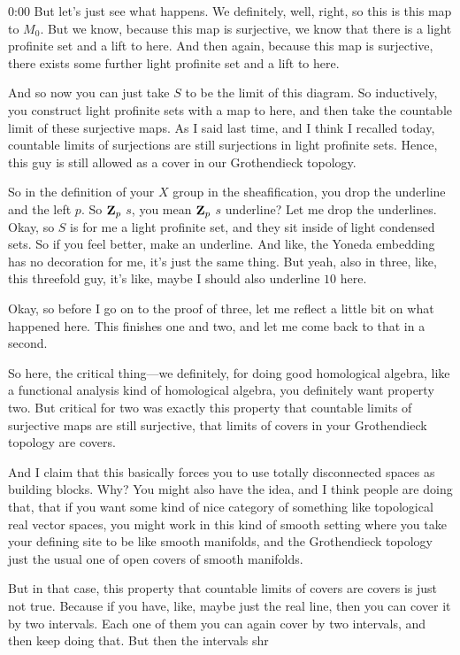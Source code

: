 \begin{unfinished}{0:00}
But let's just see what happens. We definitely, well, right, so this is this map to $M_0$. But we know, because this map is surjective, we know that there is a light profinite set and a lift to here. And then again, because this map is surjective, there exists some further light profinite set and a lift to here.

And so now you can just take $S$ to be the limit of this diagram. So inductively, you construct light profinite sets with a map to here, and then take the countable limit of these surjective maps. As I said last time, and I think I recalled today, countable limits of surjections are still surjections in light profinite sets. Hence, this guy is still allowed as a cover in our Grothendieck topology.

So in the definition of your $X$ group in the sheafification, you drop the underline and the left $p$. So $\mathbf Z_p$ $s$, you mean $\mathbf Z_p$ $s$ underline? Let me drop the underlines. Okay, so $S$ is for me a light profinite set, and they sit inside of light condensed sets. So if you feel better, make an underline. And like, the Yoneda embedding has no decoration for me, it's just the same thing. But yeah, also in three, like, this threefold guy, it's like, maybe I should also underline $10$ here.

Okay, so before I go on to the proof of three, let me reflect a little bit on what happened here. This finishes one and two, and let me come back to that in a second.

So here, the critical thing---we definitely, for doing good homological algebra, like a functional analysis kind of homological algebra, you definitely want property two. But critical for two was exactly this property that countable limits of surjective maps are still surjective, that limits of covers in your Grothendieck topology are covers.

And I claim that this basically forces you to use totally disconnected spaces as building blocks. Why? You might also have the idea, and I think people are doing that, that if you want some kind of nice category of something like topological real vector spaces, you might work in this kind of smooth setting where you take your defining site to be like smooth manifolds, and the Grothendieck topology just the usual one of open covers of smooth manifolds.

But in that case, this property that countable limits of covers are covers is just not true. Because if you have, like, maybe just the real line, then you can cover it by two intervals. Each one of them you can again cover by two intervals, and then keep doing that. But then the intervals shr


\end{unfinished}
